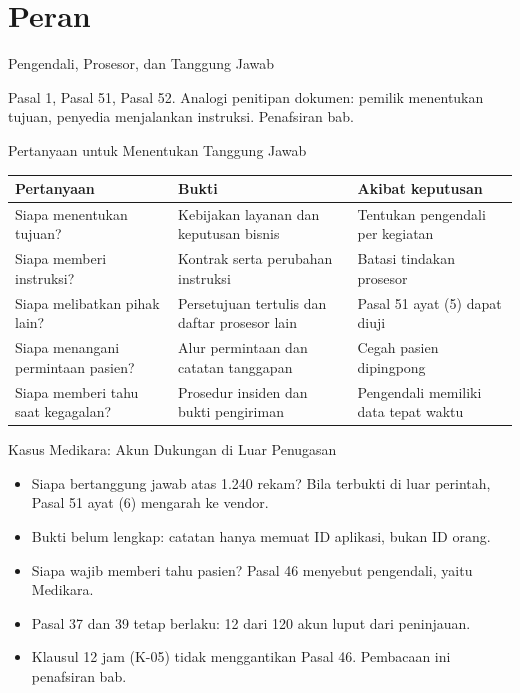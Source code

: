 \documentclass[aspectratio=169, table, 12pt]{beamer}
\begin{document}
\section{Peran}

\begin{frame}{{\Large Pengendali, Prosesor, dan Tanggung Jawab}}
  \vspace{8pt}
  \begin{center}
    \resizebox{0.97\textwidth}{!}{}
  \end{center}
  \vspace{4pt}
  \small Pasal 1, Pasal 51, Pasal 52. Analogi penitipan dokumen: pemilik menentukan tujuan, penyedia
  menjalankan instruksi. Penafsiran bab.
\end{frame}

\begin{frame}{{\Large Pertanyaan untuk Menentukan Tanggung Jawab}}
  \vspace{4pt}
  \footnotesize
  \begin{tabularx}{\textwidth}{|>{\raggedright\arraybackslash}X|>{\raggedright\arraybackslash}X|>{\raggedright\arraybackslash}X|}
    \hline
    \textbf{Pertanyaan} & \textbf{Bukti} & \textbf{Akibat keputusan} \\ \hline
    Siapa menentukan tujuan? & Kebijakan layanan dan keputusan bisnis & Tentukan pengendali per
    kegiatan \\ \hline
    Siapa memberi instruksi? & Kontrak serta perubahan instruksi & Batasi tindakan prosesor \\
    \hline
    Siapa melibatkan pihak lain? & Persetujuan tertulis dan daftar prosesor lain & Pasal 51 ayat (5)
    dapat diuji \\ \hline
    Siapa menangani permintaan pasien? & Alur permintaan dan catatan tanggapan & Cegah pasien
    dipingpong \\ \hline
    Siapa memberi tahu saat kegagalan? & Prosedur insiden dan bukti pengiriman & Pengendali memiliki
    data tepat waktu \\ \hline
  \end{tabularx}
\end{frame}

\begin{frame}{{\Large Kasus Medikara: Akun Dukungan di Luar Penugasan}}
  \vspace{6pt}
  \small
  \begin{itemize}
    \item Siapa bertanggung jawab atas 1.240 rekam? Bila terbukti di luar perintah, Pasal 51 ayat
          (6) mengarah ke vendor.
    \item Bukti belum lengkap: catatan hanya memuat ID aplikasi, bukan ID orang.
    \item Siapa wajib memberi tahu pasien? Pasal 46 menyebut pengendali, yaitu Medikara.
    \item Pasal 37 dan 39 tetap berlaku: 12 dari 120 akun luput dari peninjauan.
    \item Klausul 12 jam (K-05) tidak menggantikan Pasal 46. Pembacaan ini penafsiran bab.
  \end{itemize}
\end{frame}
\end{document}
